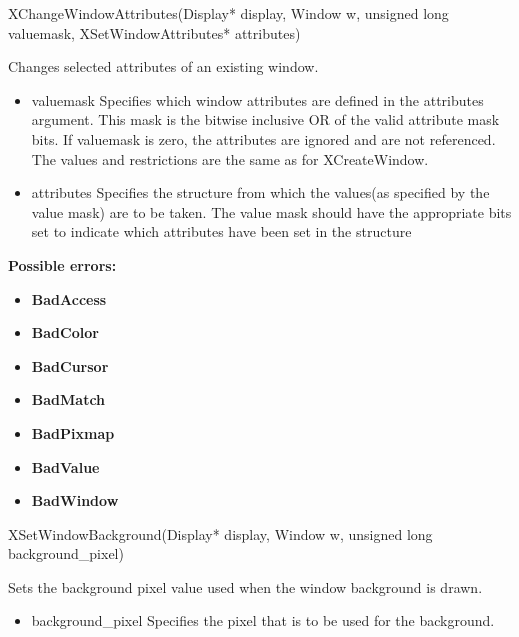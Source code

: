 \documentclass{report}
\begin{document}
\begin{itemize}
            \begin{cppcode}
                XChangeWindowAttributes(Display* display, Window w, unsigned long valuemask, XSetWindowAttributes* attributes)
            \end{cppcode}
            \bigbreak \noindent
            Changes selected attributes of an existing window.
            \begin{itemize}
                \item valuemask Specifies which window attributes are defined in the attributes argument. This mask is the bitwise inclusive OR of the valid attribute mask bits. If valuemask is zero, the attributes are ignored and are not referenced. The values and restrictions are the same as for XCreateWindow.
                \item attributes Specifies the structure from which the values(as specified by the value mask) are to be taken. The value mask should have the appropriate bits set to indicate which attributes have been set in the structure
            \end{itemize}
            \bigbreak \noindent
            \textbf{Possible errors:}
            \begin{itemize}
                \item \textbf{BadAccess}
                \item \textbf{BadColor}
                \item \textbf{BadCursor}
                \item \textbf{BadMatch}
                \item \textbf{BadPixmap}
                \item \textbf{BadValue}
                \item \textbf{BadWindow}
            \end{itemize}

            \begin{cppcode}
                XSetWindowBackground(Display* display, Window w, unsigned long background_pixel)
            \end{cppcode}
            \bigbreak \noindent
            Sets the background pixel value used when the window background is drawn.

            \begin{itemize}
                \item background\_pixel Specifies the pixel that is to be used for the background.
            \end{itemize}


\end{itemize}
\end{document}

